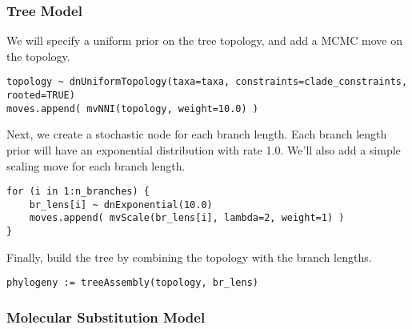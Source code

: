 \subsubsection{Tree Model}

We will specify a uniform prior on the tree topology, and add
a MCMC move on the topology.
{\tt \begin{snugshade*}
\begin{lstlisting}
topology ~ dnUniformTopology(taxa=taxa, constraints=clade_constraints, rooted=TRUE)
moves.append( mvNNI(topology, weight=10.0) )
\end{lstlisting}
\end{snugshade*}}
Next, we create a stochastic node for each branch length.
Each branch length prior will have an exponential distribution with rate 1.0.
We'll also add a simple scaling move for each branch length.
{\tt \begin{snugshade*}
\begin{lstlisting}
for (i in 1:n_branches) {
    br_lens[i] ~ dnExponential(10.0)
    moves.append( mvScale(br_lens[i], lambda=2, weight=1) )
}
\end{lstlisting}
\end{snugshade*}}
Finally, build the tree by combining the topology with the branch lengths.
{\tt \begin{snugshade*}
\begin{lstlisting}
phylogeny := treeAssembly(topology, br_lens)
\end{lstlisting}
\end{snugshade*}}

\subsubsection{Molecular Substitution Model}

